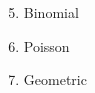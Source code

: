 \begin{enumerate}[i]
\setcounter{enumi}{4}
  \item Binomial
  \item Poisson
  \item Geometric
\end{enumerate}
